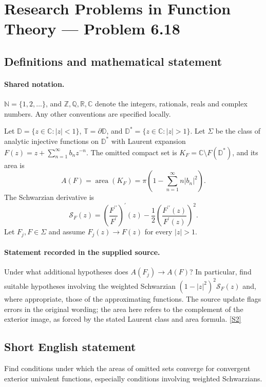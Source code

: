 \documentclass[11pt]{book}
\newcommand{\sref}[2]{\hyperlink{source:#1:#2}{[S#2]}}
\begin{document}
\section{Research Problems in Function Theory — Problem 6.18}\label{statement}

\subsection{Definitions and mathematical statement}

\paragraph{Shared notation.}$\mathbb N=\{1,2,\ldots\}$, and $\mathbb Z,\mathbb Q,\mathbb R,\mathbb C$ denote the integers, rationals, reals and complex numbers. Any other conventions are specified locally.


Let $\mathbb D=\{z\in\mathbb C:|z|<1\}$, $\mathbb T=\partial\mathbb D$, and $\mathbb D^*=\{z\in\mathbb C:|z|>1\}$. Let $\Sigma$ be the class of analytic injective functions on $\mathbb D^*$ with Laurent expansion $F(z)=z+\sum_{n=1}^{\infty}b_nz^{-n}$. The omitted compact set is $K_F=\mathbb C\setminus F(\mathbb D^*)$, and its area is \[A(F)=\operatorname{area}(K_F)=\pi\left(1-\sum_{n=1}^{\infty}n|b_n|^2\right).\] The Schwarzian derivative is \[\mathcal S_F(z)=\left(\frac{F^{\prime\prime}}{F^{\prime}}\right)^{\prime}(z)-\frac12\left(\frac{F^{\prime\prime}(z)}{F^{\prime}(z)}\right)^2.\] Let $F_j,F\in\Sigma$ and assume $F_j(z)\to F(z)$ for every $|z|>1$.
\paragraph{Statement recorded in the supplied source.}
Under what additional hypotheses does $A(F_j)\to A(F)$? In particular, find suitable hypotheses involving the weighted Schwarzian $(1-|z|^2)^2\mathcal S_F(z)$ and, where appropriate, those of the approximating functions. The source update flags errors in the original wording; the area here refers to the complement of the exterior image, as forced by the stated Laurent class and area formula. \sref{statement}{2}
\subsection{Short English statement}
Find conditions under which the areas of omitted sets converge for convergent exterior univalent functions, especially conditions involving weighted Schwarzians.
\end{document}
